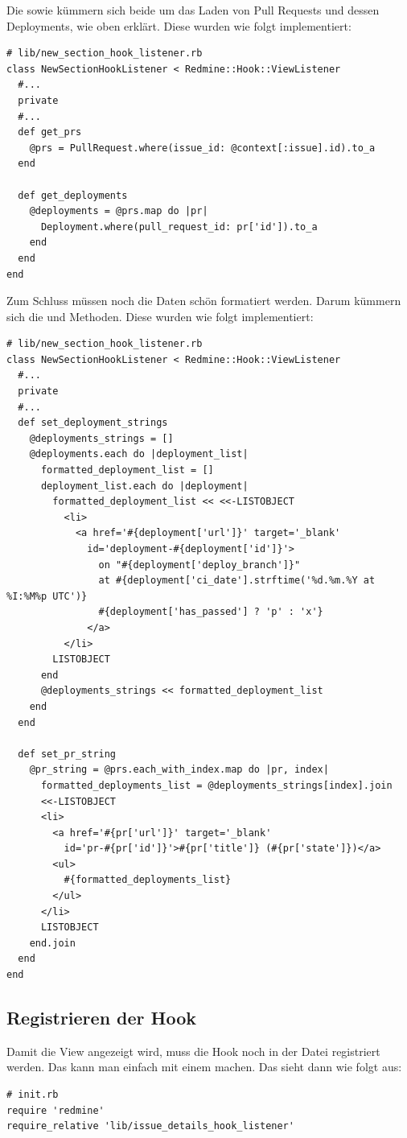 Die  sowie  kümmern sich beide um das Laden
von Pull Requests und dessen Deployments, wie oben erklärt. Diese wurden wie folgt implementiert:
\begin{codebox}[]
  \begin{verbatim}
# lib/new_section_hook_listener.rb
class NewSectionHookListener < Redmine::Hook::ViewListener
  #...
  private
  #...
  def get_prs
    @prs = PullRequest.where(issue_id: @context[:issue].id).to_a
  end

  def get_deployments
    @deployments = @prs.map do |pr|
      Deployment.where(pull_request_id: pr['id']).to_a
    end
  end
end
  \end{verbatim}
\end{codebox}
Zum Schluss müssen noch die Daten schön formatiert werden. Darum kümmern sich die \newline
{} und  Methoden. Diese wurden
wie folgt implementiert:
\begin{codebox}[]
  \begin{verbatim}
# lib/new_section_hook_listener.rb
class NewSectionHookListener < Redmine::Hook::ViewListener
  #...
  private
  #...
  def set_deployment_strings
    @deployments_strings = []
    @deployments.each do |deployment_list|
      formatted_deployment_list = []
      deployment_list.each do |deployment|
        formatted_deployment_list << <<-LISTOBJECT
          <li>
            <a href='#{deployment['url']}' target='_blank'
              id='deployment-#{deployment['id']}'>
                on "#{deployment['deploy_branch']}"
                at #{deployment['ci_date'].strftime('%d.%m.%Y at %I:%M%p UTC')}
                #{deployment['has_passed'] ? 'p' : 'x'} 
              </a>
          </li>
        LISTOBJECT
      end
      @deployments_strings << formatted_deployment_list
    end
  end

  def set_pr_string
    @pr_string = @prs.each_with_index.map do |pr, index|
      formatted_deployments_list = @deployments_strings[index].join
      <<-LISTOBJECT
      <li>
        <a href='#{pr['url']}' target='_blank'
          id='pr-#{pr['id']}'>#{pr['title']} (#{pr['state']})</a>
        <ul>
          #{formatted_deployments_list}
        </ul>  
      </li>
      LISTOBJECT
    end.join
  end
end
  \end{verbatim}
\end{codebox}
\subsection{Registrieren der Hook}
Damit die View angezeigt wird, muss die Hook noch in der  Datei registriert werden. Das
kann man einfach mit einem  machen. Das  sieht dann wie folgt aus:
\begin{codebox}[]
  \begin{verbatim}
# init.rb
require 'redmine'
require_relative 'lib/issue_details_hook_listener'
  \end{verbatim}
\end{codebox}

